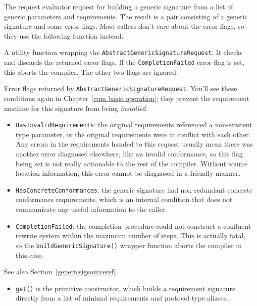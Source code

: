 \documentclass[../generics]{subfiles}
\begin{document}
The request evaluator request for building a generic signature from a list of generic parameters and requirements. The result is a pair consisting of a generic signature and some error flags. Most callers don't care about the error flags, so they use the following function instead.

A utility function wrapping the \texttt{AbstractGenericSignatureRequest}. It checks and discards the returned error flags. If the \texttt{CompletionFailed} error flag is set, this aborts the compiler. The other two flags are ignored.

Error flags returned by \texttt{AbstractGenericSignatureRequest}. You'll see these conditions again in Chapter~\ref{rqm basic operation}; they prevent the requirement machine for this signature from being \emph{installed}.
\begin{itemize}
\item \texttt{HasInvalidRequirements}: the original requirements referenced a non-existent type parameter, or the original requirements were in conflict with each other. Any errors in the requirements handed to this request usually mean there was another error diagnosed elsewhere, like an invalid conformance, so this flag being set is not really actionable to the rest of the compiler. Without source location information, this error cannot be diagnosed in a friendly manner.
\item \texttt{HasConcreteConformances}: the generic signature had non-redundant concrete conformance requirements, which is an internal condition that does not communicate any useful information to the caller.
\item \texttt{CompletionFailed}: the completion procedure could not construct a confluent rewrite system within the maximum number of steps. This is actually fatal, so the \texttt{buildGenericSignature()} wrapper function aborts the compiler in this case.
\end{itemize}

See also Section~\ref{genericsigsourceref}.
\begin{itemize}
\item \texttt{get()} is the primitive constructor, which builds a requirement signature directly from a list of minimal requirements and protocol type aliases.
\end{itemize}
\end{document}
